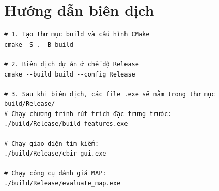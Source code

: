 \chapter{Hướng dẫn biên dịch}

\begin{verbatim}
# 1. Tạo thư mục build và cấu hình CMake
cmake -S . -B build

# 2. Biên dịch dự án ở chế độ Release
cmake --build build --config Release

# 3. Sau khi biên dịch, các file .exe sẽ nằm trong thư mục build/Release/
# Chạy chương trình rút trích đặc trưng trước:
./build/Release/build_features.exe

# Chạy giao diện tìm kiếm:
./build/Release/cbir_gui.exe

# Chạy công cụ đánh giá MAP:
./build/Release/evaluate_map.exe
\end{verbatim}
